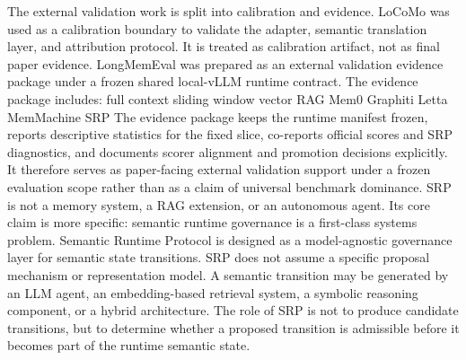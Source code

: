 {}
\markdownRendererSectionEnd \markdownRendererSectionBegin
{}\markdownRendererInterblockSeparator
{}The external validation work is split into calibration and evidence.\markdownRendererParagraphSeparator
{}LoCoMo was used as a calibration boundary to validate the adapter, semantic translation layer, and attribution protocol. It is treated as calibration artifact, not as final paper evidence.\markdownRendererParagraphSeparator
{}LongMemEval was prepared as an external validation evidence package under a frozen shared local-vLLM runtime contract. The evidence package includes:\markdownRendererInterblockSeparator
{}\markdownRendererUlBeginTight
\markdownRendererUlItem full context\markdownRendererUlItemEnd 
\markdownRendererUlItem sliding window\markdownRendererUlItemEnd 
\markdownRendererUlItem vector RAG\markdownRendererUlItemEnd 
\markdownRendererUlItem Mem0\markdownRendererUlItemEnd 
\markdownRendererUlItem Graphiti\markdownRendererUlItemEnd 
\markdownRendererUlItem Letta\markdownRendererUlItemEnd 
\markdownRendererUlItem MemMachine\markdownRendererUlItemEnd 
\markdownRendererUlItem SRP\markdownRendererUlItemEnd 
\markdownRendererUlEndTight \markdownRendererInterblockSeparator
{}The evidence package keeps the runtime manifest frozen, reports descriptive statistics for the fixed slice, co-reports official scores and SRP diagnostics, and documents scorer alignment and promotion decisions explicitly. It therefore serves as paper-facing external validation support under a frozen evaluation scope rather than as a claim of universal benchmark dominance.\markdownRendererInterblockSeparator
{}
\markdownRendererSectionEnd 
\markdownRendererSectionEnd \markdownRendererSectionBegin
{}\markdownRendererInterblockSeparator
{}SRP is not a memory system, a RAG extension, or an autonomous agent. Its core claim is more specific: semantic runtime governance is a first-class systems problem.\markdownRendererInterblockSeparator
{}\markdownRendererSectionBegin
{}\markdownRendererInterblockSeparator
{}Semantic Runtime Protocol is designed as a model-agnostic governance layer for semantic state transitions. SRP does not assume a specific proposal mechanism or representation model. A semantic transition may be generated by an LLM agent, an embedding-based retrieval system, a symbolic reasoning component, or a hybrid architecture. The role of SRP is not to produce candidate transitions, but to determine whether a proposed transition is admissible before it becomes part of the runtime semantic state.\markdownRendererParagraphSeparator
